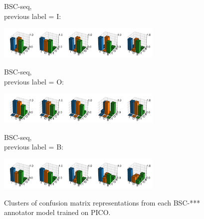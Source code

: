 %
%

\begin{figure}[h]
\begin{minipage}[b][1cm][l]{0.2\textwidth} 
BSC-seq, \\
previous label = I:
\end{minipage}
  \includegraphics[width=0.7\textwidth, clip=True, trim=20 16 0 28]{figures/worker_models/seq_prev0}
\\
\begin{minipage}[b][1cm][l]{0.2\textwidth} 
BSC-seq, \\
previous label = O:
\end{minipage}
  \includegraphics[width=0.7\textwidth, clip=True, trim=20 16 0 28]{figures/worker_models/seq_prev1}
\\
\begin{minipage}[b][1cm][l]{0.2\textwidth} 
BSC-seq,\\
 previous label = B:
\end{minipage}
  \includegraphics[width=0.7\textwidth, clip=True, trim=20 17 0 28]{figures/worker_models/seq_prev2}
\\
\caption{Clusters of confusion matrix representations from each BSC-*** annotator model trained on PICO. 
}
\label{fig:conf_mat_clusters}
\end{figure}
